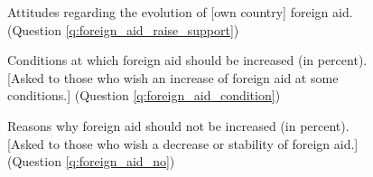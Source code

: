 \documentclass[12pt,english]{article}
\begin{document}
\begin{figure}[h!]
    \caption[Attitudes on the evolution of foreign aid]{Attitudes regarding the evolution of [own country] foreign aid. (Question \ref{q:foreign_aid_raise_support})}\label{fig:foreign_aid_raise_support}
\end{figure}

\begin{figure}[h!]
    \caption[Conditions at which foreign aid should be increased]{Conditions at which foreign aid should be increased (in percent). [Asked to those who wish an increase of foreign aid at some conditions.] (Question \ref{q:foreign_aid_condition})}\label{fig:foreign_aid_condition}
\end{figure}

\begin{figure}[h!]
    \caption[Reasons why foreign aid should not be increased]{Reasons why foreign aid should not be increased (in percent). [Asked to those who wish a decrease or stability of foreign aid.] (Question \ref{q:foreign_aid_no})}\label{fig:foreign_aid_no}
\end{figure}
\end{document}
